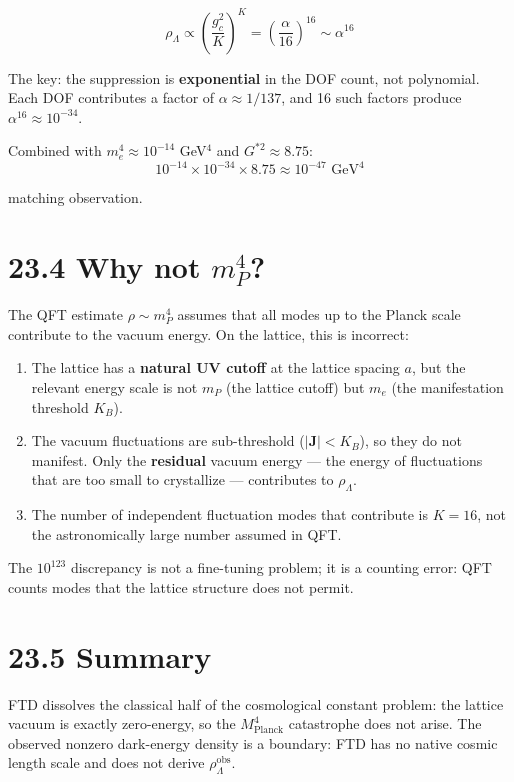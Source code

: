\documentclass[
  11pt,
  letterpaper,
  twoside,
  openany]{book}
\makeatletter
\providecommand{\tightlist}{%
  \setlength{\itemsep}{0pt}\setlength{\parskip}{0pt}}
\let\orig@section\section
\renewcommand{\section}{\needspace{8\baselineskip}\orig@section}
\makeatother
\begin{document}
\[
\rho_\Lambda \propto \left(\frac{g_c^2}{K}\right)^K = \left(\frac{\alpha}{16}\right)^{16} \sim \alpha^{16}
\]

The key: the suppression is \textbf{exponential} in the DOF count, not
polynomial. Each DOF contributes a factor of \(\alpha \approx 1/137\),
and 16 such factors produce \(\alpha^{16} \approx 10^{-34}\).

Combined with \(m_e^4 \approx 10^{-14}\) GeV\(^4\) and
\(G^{*2} \approx 8.75\): \[
10^{-14} \times 10^{-34} \times 8.75 \approx 10^{-47} \text{ GeV}^4
\]

matching observation.

\section{\texorpdfstring{23.4 Why not
\(m_P^4\)?}{23.4 Why not m\_P\^{}4?}}\label{why-not-m_p4}

The QFT estimate \(\rho \sim m_P^4\) assumes that all modes up to the
Planck scale contribute to the vacuum energy. On the lattice, this is
incorrect:

\begin{enumerate}
\def\labelenumi{\arabic{enumi}.}
\tightlist
\item
  The lattice has a \textbf{natural UV cutoff} at the lattice spacing
  \(a\), but the relevant energy scale is not \(m_P\) (the lattice
  cutoff) but \(m_e\) (the manifestation threshold \(K_B\)).
\item
  The vacuum fluctuations are sub-threshold (\(|\mathbf{J}| < K_B\)), so
  they do not manifest. Only the \textbf{residual} vacuum energy --- the
  energy of fluctuations that are too small to crystallize ---
  contributes to \(\rho_\Lambda\).
\item
  The number of independent fluctuation modes that contribute is
  \(K = 16\), not the astronomically large number assumed in QFT.
\end{enumerate}

The \(10^{123}\) discrepancy is not a fine-tuning problem; it is a
counting error: QFT counts modes that the lattice structure does not
permit.

\section{23.5 Summary}\label{summary-2}

FTD dissolves the classical half of the cosmological constant problem:
the lattice vacuum is exactly zero-energy, so the \(M_\text{Planck}^4\)
catastrophe does not arise. The observed nonzero dark-energy density is
a boundary: FTD has no native cosmic length scale and does not derive
\(\rho_\Lambda^\text{obs}\).
\end{document}
